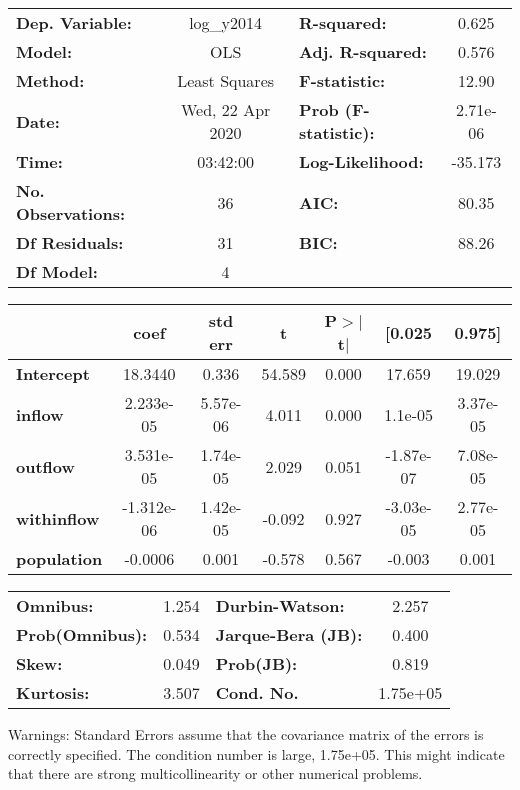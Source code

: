 \begin{center}
\begin{tabular}{lclc}
\toprule
\textbf{Dep. Variable:}    &    log\_y2014    & \textbf{  R-squared:         } &     0.625   \\
\textbf{Model:}            &       OLS        & \textbf{  Adj. R-squared:    } &     0.576   \\
\textbf{Method:}           &  Least Squares   & \textbf{  F-statistic:       } &     12.90   \\
\textbf{Date:}             & Wed, 22 Apr 2020 & \textbf{  Prob (F-statistic):} &  2.71e-06   \\
\textbf{Time:}             &     03:42:00     & \textbf{  Log-Likelihood:    } &   -35.173   \\
\textbf{No. Observations:} &          36      & \textbf{  AIC:               } &     80.35   \\
\textbf{Df Residuals:}     &          31      & \textbf{  BIC:               } &     88.26   \\
\textbf{Df Model:}         &           4      & \textbf{                     } &             \\
\bottomrule
\end{tabular}
\begin{tabular}{lcccccc}
                    & \textbf{coef} & \textbf{std err} & \textbf{t} & \textbf{P$> |$t$|$} & \textbf{[0.025} & \textbf{0.975]}  \\
\midrule
\textbf{Intercept}  &      18.3440  &        0.336     &    54.589  &         0.000        &       17.659    &       19.029     \\
\textbf{inflow}     &    2.233e-05  &     5.57e-06     &     4.011  &         0.000        &      1.1e-05    &     3.37e-05     \\
\textbf{outflow}    &    3.531e-05  &     1.74e-05     &     2.029  &         0.051        &    -1.87e-07    &     7.08e-05     \\
\textbf{withinflow} &   -1.312e-06  &     1.42e-05     &    -0.092  &         0.927        &    -3.03e-05    &     2.77e-05     \\
\textbf{population} &      -0.0006  &        0.001     &    -0.578  &         0.567        &       -0.003    &        0.001     \\
\bottomrule
\end{tabular}
\begin{tabular}{lclc}
\textbf{Omnibus:}       &  1.254 & \textbf{  Durbin-Watson:     } &    2.257  \\
\textbf{Prob(Omnibus):} &  0.534 & \textbf{  Jarque-Bera (JB):  } &    0.400  \\
\textbf{Skew:}          &  0.049 & \textbf{  Prob(JB):          } &    0.819  \\
\textbf{Kurtosis:}      &  3.507 & \textbf{  Cond. No.          } & 1.75e+05  \\
\bottomrule
\end{tabular}
\end{center}

Warnings: \newline
 [1] Standard Errors assume that the covariance matrix of the errors is correctly specified. \newline
 [2] The condition number is large, 1.75e+05. This might indicate that there are \newline
 strong multicollinearity or other numerical problems.